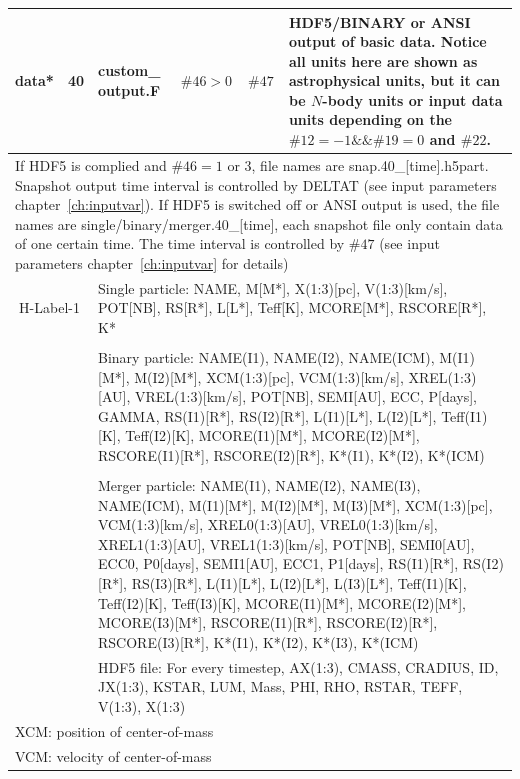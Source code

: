 \begin{longtable}{||p{0.42in}|p{0.25in}|p{0.6in}|p{0.6in}|p{0.4in}|p{2.3in}||}
 data*    & 40  & custom\_ output.F & $\#46>0$ & $\#47$ & HDF5/BINARY or ANSI output of basic data. Notice all units here are shown as astrophysical units, but it can be $N$-body units or input data units depending on the $\#12=-1 \&\& \#19=0$ and $\#22$.\\\hline
\multicolumn{6}{|p{5.4in}|}{ If HDF5 is complied and $\#46=1$ or $3$, file names are snap.40\_[time].h5part. Snapshot output time interval is controlled by DELTAT (see input parameters chapter~\ref{ch:inputvar}). If HDF5 is switched off or ANSI output is used, the file names are single/binary/merger.40\_[time], each snapshot file only contain data of one certain time. The time interval is controlled by $\#47$ (see input parameters chapter~\ref{ch:inputvar} for details) }\\\hline
\multicolumn{2}{|c|}{ H-Label-1 } & \multicolumn{4}{|p{4.4in}|}{Single particle:  NAME, M[M*], X(1:3)[pc], V(1:3)[km$/$s], POT[NB], RS[R*], L[L*],  Teff[K], MCORE[M*], RSCORE[R*], K*} \\\\
\multicolumn{2}{|c|}{       } & \multicolumn{4}{|p{4.4in}|}{Binary particle:  NAME(I1), NAME(I2), NAME(ICM), M(I1)[M*], M(I2)[M*], XCM(1:3)[pc], VCM(1:3)[km/s], XREL(1:3)[AU], VREL(1:3)[km/s], POT[NB], SEMI[AU], ECC, P[days], GAMMA, RS(I1)[R*], RS(I2)[R*], L(I1)[L*], L(I2)[L*], Teff(I1)[K], Teff(I2)[K], MCORE(I1)[M*], MCORE(I2)[M*], RSCORE(I1)[R*], RSCORE(I2)[R*], K*(I1), K*(I2), K*(ICM)} \\\\
\multicolumn{2}{|c|}{       } & \multicolumn{4}{|p{4.4in}|}{Merger particle:  NAME(I1), NAME(I2), NAME(I3), NAME(ICM), M(I1)[M*], M(I2)[M*], M(I3)[M*], XCM(1:3)[pc], VCM(1:3)[km/s], XREL0(1:3)[AU], VREL0(1:3)[km/s], XREL1(1:3)[AU], VREL1(1:3)[km/s], POT[NB], SEMI0[AU], ECC0, P0[days], SEMI1[AU], ECC1, P1[days], RS(I1)[R*], RS(I2)[R*], RS(I3)[R*], L(I1)[L*], L(I2)[L*], L(I3)[L*], Teff(I1)[K], Teff(I2)[K], Teff(I3)[K], MCORE(I1)[M*], MCORE(I2)[M*], MCORE(I3)[M*], RSCORE(I1)[R*], RSCORE(I2)[R*], RSCORE(I3)[R*], K*(I1), K*(I2), K*(I3), K*(ICM)} \\\hline
\multicolumn{2}{|c|}{       } & \multicolumn{4}{|p{4.4in}|}{HDF5 file: For every timestep, AX(1:3),  CMASS, CRADIUS, ID, JX(1:3), KSTAR, LUM, Mass, PHI, RHO, RSTAR, TEFF, V(1:3), X(1:3)} \\\hline
\multicolumn{6}{|p{5.4in}|}{ XCM: position of center-of-mass}\\
\multicolumn{6}{|p{5.4in}|}{ VCM: velocity of center-of-mass}\\

\end{longtable}
